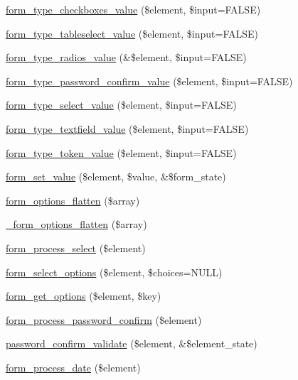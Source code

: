 \begin{DoxyCompactItemize}
\item 
\hyperlink{group__form__api_gaab8c7b8878c056d35d6000bb0fab3b2b}{form\_\-type\_\-checkboxes\_\-value} (\$element, \$input=FALSE)
\item 
\hyperlink{group__form__api_gad36759844e875d35e1e220e90c460984}{form\_\-type\_\-tableselect\_\-value} (\$element, \$input=FALSE)
\item 
\hyperlink{group__form__api_gaf0ad41f155f7ae8eae8386f3702b56f8}{form\_\-type\_\-radios\_\-value} (\&\$element, \$input=FALSE)
\item 
\hyperlink{group__form__api_ga3e473dba683cd32c95de1193f2a8fb94}{form\_\-type\_\-password\_\-confirm\_\-value} (\$element, \$input=FALSE)
\item 
\hyperlink{group__form__api_ga244474506f87e80bc91f5d1e3be2a35e}{form\_\-type\_\-select\_\-value} (\$element, \$input=FALSE)
\item 
\hyperlink{group__form__api_gaf2e351ecad2b3f0a3b319d110bf4b84b}{form\_\-type\_\-textfield\_\-value} (\$element, \$input=FALSE)
\item 
\hyperlink{group__form__api_ga0f9d352bfa7b36285b8ba1bf9fe3c9ca}{form\_\-type\_\-token\_\-value} (\$element, \$input=FALSE)
\item 
\hyperlink{group__form__api_ga2a377a1fcccea79d06d1a735dea433f3}{form\_\-set\_\-value} (\$element, \$value, \&\$form\_\-state)
\item 
\hyperlink{group__form__api_ga683d5114e3e455ffee9bbfbb8b947bb7}{form\_\-options\_\-flatten} (\$array)
\item 
\hyperlink{group__form__api_gabd44cc736d333ca82ef8c6d1dba2dc96}{\_\-form\_\-options\_\-flatten} (\$array)
\item 
\hyperlink{group__form__api_ga1a2156b4aa18f567264d8c7aafd85dca}{form\_\-process\_\-select} (\$element)
\item 
\hyperlink{group__form__api_ga018022f493d295538cb6d8d312dab866}{form\_\-select\_\-options} (\$element, \$choices=NULL)
\item 
\hyperlink{group__form__api_ga88bf27e1f6246789acc77dd1686e0276}{form\_\-get\_\-options} (\$element, \$key)
\item 
\hyperlink{group__form__api_gae3a3dcd1a5e4e44c5c03bb1426066596}{form\_\-process\_\-password\_\-confirm} (\$element)
\item 
\hyperlink{group__form__api_gafa275652bc0a5641a124bc60727caa8a}{password\_\-confirm\_\-validate} (\$element, \&\$element\_\-state)
\item 
\hyperlink{group__form__api_gabc6b74cff84954f970d4997390473160}{form\_\-process\_\-date} (\$element)

\end{DoxyCompactItemize}
